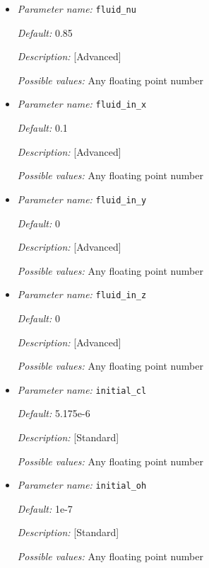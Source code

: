 \begin{itemize}
{\it Possible values:} Any floating point number


\item {\it Parameter name:} {\tt fluid\_nu}
\label{parameters:fluid_nu}


{\it Default:} 0.85

{\it Description:} [Advanced] 

{\it Possible values:} Any floating point number


\item {\it Parameter name:} {\tt fluid\_in\_x}
\label{parameters:fluid_in_x}


{\it Default:} 0.1

{\it Description:} [Advanced] 

{\it Possible values:} Any floating point number


\item {\it Parameter name:} {\tt fluid\_in\_y}
\label{parameters:fluid_in_y}


{\it Default:} 0

{\it Description:} [Advanced] 

{\it Possible values:} Any floating point number


\item {\it Parameter name:} {\tt fluid\_in\_z}
\label{parameters:fluid_in_z}


{\it Default:} 0

{\it Description:} [Advanced] 

{\it Possible values:} Any floating point number


\item {\it Parameter name:} {\tt initial\_cl}
\label{parameters:initial_cl}


{\it Default:} 5.175e-6

{\it Description:} [Standard] 

{\it Possible values:} Any floating point number


\item {\it Parameter name:} {\tt initial\_oh}
\label{parameters:initial_oh}


{\it Default:} 1e-7

{\it Description:} [Standard] 

{\it Possible values:} Any floating point number


\end{itemize}



